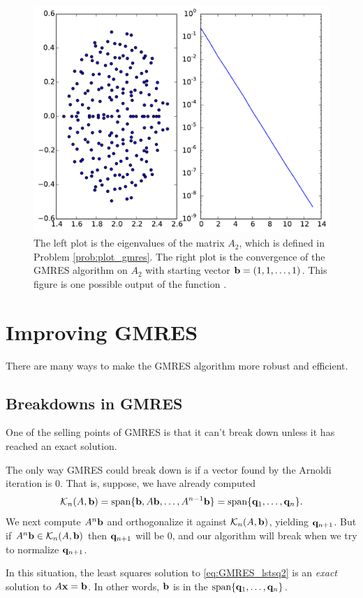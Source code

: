 \begin{problem}
\begin{figure}[H]
\includegraphics[width=.7\textwidth]{plot_gmres.pdf}
\caption{The left plot is the eigenvalues of the matrix $A_2$, which is defined in Problem \ref{prob:plot_gmres}.
The right plot is the convergence of the GMRES algorithm on $A_2$ with starting vector ${\bf b} = (1, 1, \ldots, 1)$.
This figure is one possible output of the function .}
\label{fig:plot_gmres}
\end{figure}
\end{problem}


\section*{Improving GMRES}
There are many ways to make the GMRES algorithm more robust and efficient.


\subsection*{Breakdowns in GMRES}
One of the selling points of GMRES is that it can't break down unless it has reached an exact solution.

The only way GMRES could break down is if a vector found by the Arnoldi iteration is 0.
That is, suppose, we have already computed 
\[\mathcal{K}_n(A, {\bf b}) = \text{span}\{{\bf b}, A{\bf b}, \ldots, A^{n-1}{\bf b}\} = \text{span}\{{\bf q}_1, \ldots, {\bf q}_n\}.\]
We next compute $A^n{\bf b}$ and orthogonalize it against $\mathcal{K}_n(A, {\bf b})$, yielding ${\bf q}_{n+1}$.
But if $A^n{\bf b} \in \mathcal{K}_n(A,{\bf b})$ then ${\bf q}_{n+1}$ will be 0, and our algorithm will break when we try to normalize ${\bf q}_{n+1}$.

In this situation, the least squares solution to \eqref{eq:GMRES_lstsq2} is an \emph{exact} solution to $A{\bf x}={\bf b}$. 
In other words, ${\bf b}$ is in the $\text{span}\{{\bf q}_1, \ldots, {\bf q}_n\}$.

